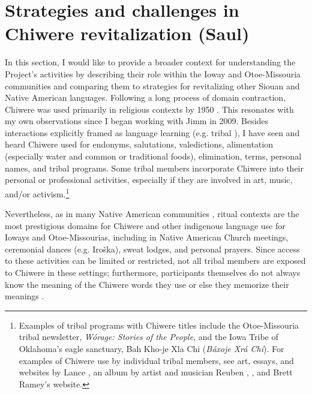 \documentclass[output=paper]{LSP/langsci}
\begin{document}
\section{Strategies and challenges in Chiwere revitalization (Saul)}\label{saul}
In this section, I would like to provide a broader context for understanding the Project's activities by describing their role within the Ioway and Otoe-Missouria communities and comparing them to strategies for revitalizing other Siouan and Native American languages. Following a long process of domain contraction, Chiwere was used primarily in religious contexts by 1950 \citep{Davidson1997, FurbeeStanley1996, FurbeeStanley2002}. This resonates with my own observations since I began working with Jimm in 2009. Besides interactions explicitly framed as language learning (e.g. tribal ), I have seen and heard Chiwere used for endonyms, salutations, valedictions, alimentation (especially water and common or traditional foods), elimination,  terms, personal names, and tribal programs. Some tribal members incorporate Chiwere into their personal or professional activities, especially if they are involved in art, music, and/or activism.\footnote{Examples of tribal programs with Chiwere titles include the Otoe-Missouria tribal newsletter, \emph{Wórage: Stories of the People}, and the Iowa Tribe of Oklahoma's eagle sanctuary, Bah Kho-je Xla Chi (\emph{Báxoje Xrá Chí}). For examples of Chiwere use by individual tribal members, see art, essays, and websites by Lance \citet{Foster1989, Foster1996, Foster1999, Foster2009, FosterNDa, FosterNDb, FosterNDc}, an album by artist and musician Reuben \citet{Kent2004}, \citet{Jones2004}, and Brett Ramey's \citeyearpar{RameyND} website.} 

Nevertheless, as in many Native American communities \citep[see e.g.][]{Kroskrity1998}, ritual contexts are the most prestigious domains for Chiwere and other indigenous language use for Ioways and Otoe-Missourias, including in Native American Church meetings, ceremonial dances (e.g. Iroška), sweat lodges, and personal prayers. Since access to these activities can be limited or restricted, not all tribal members are exposed to Chiwere in these settings; furthermore, participants themselves do not always know the meaning of the Chiwere words they use or else they memorize their meanings \citep[see e.g.][520--521]{Davidson1997}.
\end{document}
